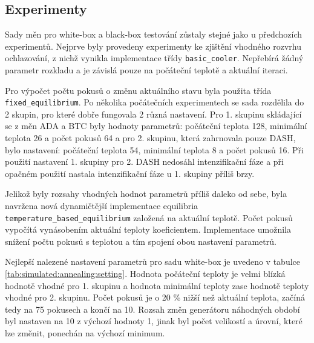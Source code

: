 \subsection{Experimenty}
Sady měn pro white-box a black-box testování zůstaly stejné jako u předchozích experimentů.
Nejprve byly provedeny experimenty ke zjištění vhodného rozvrhu ochlazování, z nichž vynikla implementace třídy \texttt{basic\_cooler}.
Nepřebírá žádný parametr rozkladu a je závislá pouze na počáteční teplotě a aktuální iteraci.

Pro výpočet počtu pokusů o změnu aktuálního stavu byla použita třída \texttt{fixed\_equilibrium}.
Po několika počátečních experimentech se sada rozdělila do 2 skupin, pro které dobře fungovala 2 různá nastavení.
Pro 1. skupinu skládající se z měn ADA a BTC byly hodnoty parametrů: počáteční teplota 128, minimální teplota 26 a počet pokusů 64 a pro 2. skupinu, která zahrnovala pouze DASH, bylo nastavení: počáteční teplota 54, minimální teplota 8 a počet pokusů 16.
Při použití nastavení 1. skupiny pro 2. DASH nedosáhl intenzifikační fáze a při opačném použití nastala intenzifikační fáze u 1. skupiny příliš brzy.

Jelikož byly rozsahy vhodných hodnot parametrů příliš daleko od sebe, byla navržena nová dynamičtější implementace equilibria  \texttt{temperature\_based\_equilibrium} založená na aktuální teplotě.
Počet pokusů vypočítá vynásobením aktuální teploty koeficientem.
Implementace umožnila snížení počtu pokusů s teplotou a tím spojení obou nastavení parametrů.

Nejlepší nalezené nastavení parametrů pro sadu white-box je uvedeno v tabulce \ref{tab:simulated:annealing:setting}.
Hodnota počáteční teploty je velmi blízká hodnotě vhodné pro 1. skupinu a hodnota minimální teploty zase hodnotě teploty vhodné pro 2. skupinu.
Počet pokusů je o 20 \% nižší než aktuální teplota, začíná tedy na 75 pokusech a končí na 10.
Rozsah změn generátoru náhodných období byl nastaven na 10 z výchozí hodnoty 1, jinak byl počet velikostí a úrovní, které lze změnit, ponechán na výchozí minimum.

